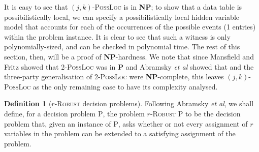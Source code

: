 \documentclass[reprint]{revtex4-1}
\theoremstyle{definition}
\newtheorem{defn}{Definition}
\begin{document}
It is easy to see that $(j,k)$-\textsc{PossLoc} is in \textbf{NP}; to show that a data table is possibilistically local, we can specify a possibilistically local hidden variable model that accounts for each of the occurrences of the possible events (1 entries) within the problem instance. It is clear to see that such a witness is only polynomially-sized, and can be checked in polynomial time. The rest of this section, then, will be a proof of \textbf{NP}-hardness. We note that since Mansfield and Fritz \cite{Mans2011} showed that \textsc{2-PossLoc} was in \textbf{P} and Abramsky \emph{et al} showed that   and the three-party generalisation of \textsc{2-PossLoc} were \textbf{NP}-complete, this leaves $(j,k)$-\textsc{PossLoc} as the only remaining case to have its complexity analysed.

\begin{defn}[$r$-\textsc{Robust} decision problems]	
Following Abramsky \emph{et al}, we shall define, for a decision problem \textsc{P}, the problem $r$-\textsc{Robust P} to be the decision problem that, given an instance of \textsc{P}, asks whether or not every assignment of $r$ variables in the problem can be extended to a satisfying assignment of the problem.
\end{defn}
\end{document}
